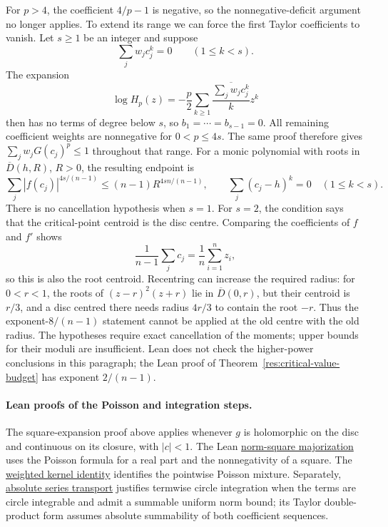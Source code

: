 \documentclass[11pt]{article}
\begin{document}
For $p>4$, the coefficient $4/p-1$ is negative, so the nonnegative-deficit
argument no longer applies. To extend its range we can force the first
Taylor coefficients to vanish. Let $s\ge1$ be an integer and suppose
\[
 \sum_jw_jc_j^k=0\qquad(1\le k<s).
\]
The expansion
\[
 \log H_p(z)=-\frac p2\sum_{k\ge1}
       \frac{\overline{\sum_jw_jc_j^k}}{k}z^k
\]
then has no terms of degree below $s$, so $b_1=\cdots=b_{s-1}=0$. All remaining
coefficient weights are nonnegative for $0<p\le4s$. The same proof
therefore gives $\sum_jw_jG(c_j)^p\le1$ throughout that range.
For a monic polynomial with roots in $\overline D(h,R)$, $R>0$,
the resulting endpoint is
\[
 \sum_j|f(c_j)|^{4s/(n-1)}\le(n-1)R^{4sn/(n-1)},
 \qquad \sum_j(c_j-h)^k=0\quad(1\le k<s).
\]
There is no cancellation hypothesis when $s=1$. For $s=2$, the condition
says that the critical-point centroid is the disc centre. Comparing the
coefficients of $f$ and $f'$ shows
\[
 \frac1{n-1}\sum_jc_j=\frac1n\sum_{i=1}^n z_i,
\]
so this is also the root centroid. Recentring can increase the required
radius: for $0<r<1$, the roots of $(z-r)^2(z+r)$ lie in
$\overline D(0,r)$, but their centroid is $r/3$, and a disc centred
there needs radius $4r/3$ to contain the root $-r$. Thus the
exponent-$8/(n-1)$ statement cannot be applied at the old centre with
the old radius. The hypotheses require exact cancellation of the moments; upper
bounds for their moduli are insufficient. Lean does not check the higher-power conclusions in this
paragraph; the Lean proof of Theorem~\ref{res:critical-value-budget} has
exponent $2/(n-1)$.

\paragraph{Lean proofs of the Poisson and integration steps.}
The square-expansion proof above applies whenever $g$ is holomorphic on
the disc and continuous on its closure, with $|c|<1$. The Lean
\href{https://github.com/wcook04/plectis-erdos/blob/d4fed71423840f70f10edf27b9ad27c22fc4f49a/ErdosProblems/Erdos1041/PoissonNormSquare.lean#L114}{norm-square majorization}
uses the Poisson formula for a real part and the nonnegativity of a square.
The \href{https://github.com/wcook04/plectis-erdos/blob/d4fed71423840f70f10edf27b9ad27c22fc4f49a/ErdosProblems/Erdos1041/PoissonKernelBridge.lean#L27}{weighted kernel identity}
identifies the pointwise Poisson mixture.  Separately,
\href{https://github.com/wcook04/plectis-erdos/blob/d4fed71423840f70f10edf27b9ad27c22fc4f49a/ErdosProblems/Erdos1041/CircleSeriesTransport.lean#L49}{absolute series transport}
justifies termwise circle integration when the terms are circle integrable
and admit a summable uniform norm bound; its Taylor double-product form
assumes absolute summability of both coefficient sequences.
\end{document}

